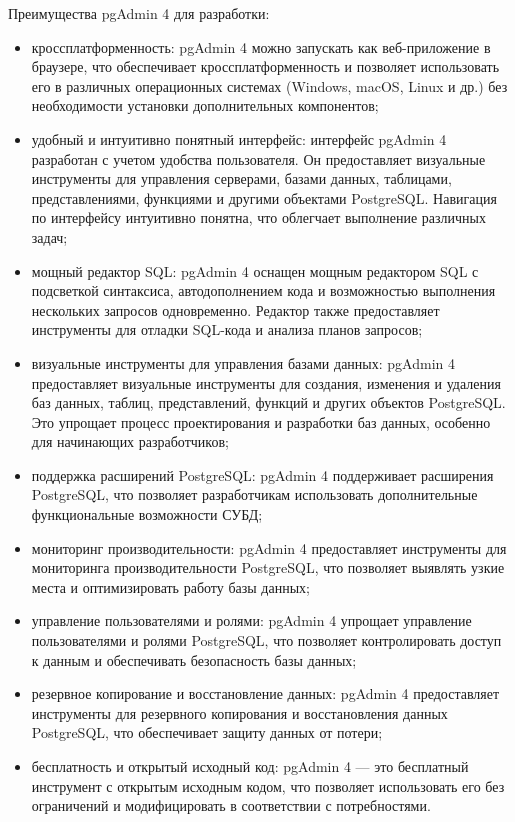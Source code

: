 Преимущества pgAdmin 4 для разработки:
\begin{itemize}
\item	кроссплатформенность: pgAdmin 4 можно запускать как веб-приложение в браузере, что обеспечивает кроссплатформенность и позволяет использовать его в различных операционных системах (Windows, macOS, Linux и др.) без необходимости установки дополнительных компонентов;

\item	удобный и интуитивно понятный интерфейс: интерфейс pgAdmin 4 разработан с учетом удобства пользователя. Он предоставляет визуальные инструменты для управления серверами, базами данных, таблицами, представлениями, функциями и другими объектами PostgreSQL. Навигация по интерфейсу интуитивно понятна, что облегчает выполнение различных задач;

\item	мощный редактор SQL: pgAdmin 4 оснащен мощным редактором SQL с подсветкой синтаксиса, автодополнением кода и возможностью выполнения нескольких запросов одновременно. Редактор также предоставляет инструменты для отладки SQL-кода и анализа планов запросов;

\item	визуальные инструменты для управления базами данных: pgAdmin 4 предоставляет визуальные инструменты для создания, изменения и удаления баз данных, таблиц, представлений, функций и других объектов PostgreSQL. Это упрощает процесс проектирования и разработки баз данных, особенно для начинающих разработчиков;

\item	поддержка расширений PostgreSQL: pgAdmin 4 поддерживает расширения PostgreSQL, что позволяет разработчикам использовать дополнительные функциональные возможности СУБД;

\item	мониторинг производительности: pgAdmin 4 предоставляет инструменты для мониторинга производительности PostgreSQL, что позволяет выявлять узкие места и оптимизировать работу базы данных;

\item	управление пользователями и ролями: pgAdmin 4 упрощает управление пользователями и ролями PostgreSQL, что позволяет контролировать доступ к данным и обеспечивать безопасность базы данных;

\item	резервное копирование и восстановление данных: pgAdmin 4 предоставляет инструменты для резервного копирования и восстановления данных PostgreSQL, что обеспечивает защиту данных от потери;

\item	бесплатность и открытый исходный код: pgAdmin 4 — это бесплатный инструмент с открытым исходным кодом, что позволяет использовать его без ограничений и модифицировать в соответствии с потребностями.
\end{itemize}
